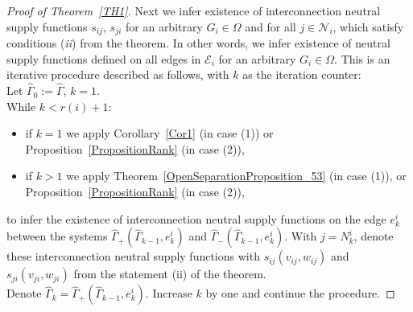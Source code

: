 \documentclass[11pt,a4paper,oneside,DIV=12,headings=small]{scrartcl}
\theoremstyle{plain}
\begin{document}
\begin{proof}[Proof of Theorem~\ref{TH1}]
Next we infer existence of interconnection neutral supply functions $s_{ij}$, $s_{ji}$ for an arbitrary $G_i \in \Omega$ and for all $j \in \mathcal{N}_i$, which satisfy conditions (\emph{ii}) from the theorem. In other words, we infer existence of neutral supply functions defined on all edges in $\mathcal{E}_i$ for an arbitrary $G_i \in \Omega$. This is an iterative procedure described as follows, with $k$ as the iteration counter:\\
Let $\hat \Gamma_0 := \hat \Gamma$, $k=1$.\\
While $k < r(i) +1$:
\begin{itemize}
	\item if $k=1$ we apply Corollary~\ref{Cor1} (in case (1)) or Proposition~\ref{PropositionRank} (in case (2)), 
	\item if $k > 1$ we apply Theorem~\ref{OpenSeparationProposition_53} (in case (1)), or Proposition~\ref{PropositionRank} (in case (2)),
\end{itemize}
to infer the existence of interconnection neutral supply functions on the edge $e^i_k$ between the systems $\hat{\Gamma}_+(\hat{\Gamma}_{k-1},e^i_k)$ and $\hat{\Gamma}_-(\hat{\Gamma}_{k-1},e^i_k)$. With $j=N_k^i$, denote these interconnection neutral supply functions with $s_{ij}(v_{ij}, w_{ij})$ and $s_{ji}(v_{ji},w_{ji})$ from the statement (ii) of the theorem. \\
Denote $\hat \Gamma_k = \hat \Gamma_+ (\hat \Gamma_{k-1}, e_k^i)$. Increase $k$ by one and continue the procedure.


\end{proof}
\end{document}
